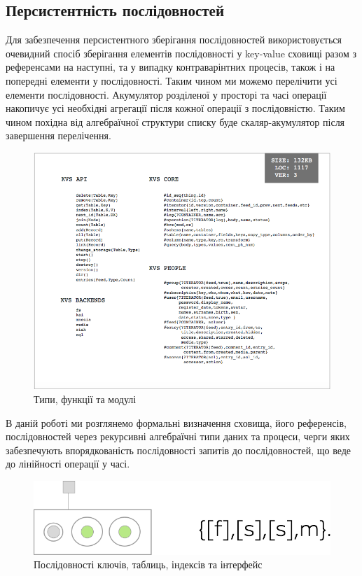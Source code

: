 \documentclass[11pt,oneside]{article}
\begin{document}
\newpage
\subsection{Персистентність послідовностей}

Для забезпечення персистентного зберігання послідовностей використовується
очевидний спосіб зберігання елементів послідовності у key-value сховищі разом
з референсами на наступні, та у випадку контраварінтних процесів, також і на
попередні елементи у послідовності. Таким чином ми можемо перелічити усі
елементи послідовності. Акумулятор розділеної у просторі та часі операції
накопичує усі необхідні агрегації після кожної операції з послідовністю. Таким
чином похідна від алгебраїчної структури списку буде скаляр-акумулятор після
завершення перелічення.

\begin{figure}[h!]
\centering
\includegraphics[scale=0.4]{img/exe-kvs-api}
\caption{Типи, функції та модулі}
\end{figure}

В даній роботі ми розглянемо формальні визначення сховища, його референсів, послідовностей через рекурсивні
алгебраїчні типи даних та процеси, черги яких забезпечують впорядкованість послідовності
запитів до послідовностей, що веде до лінійності операції у часі.

\begin{figure}[h!]
\centering
\includegraphics[scale=0.4]{img/exe-kvs}
\caption{Послідовності ключів, таблиць, індексів та інтерфейс}
\end{figure}
\end{document}
